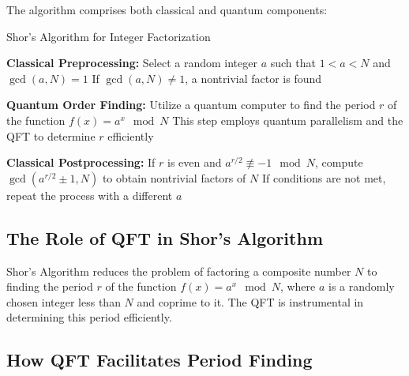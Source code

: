 \documentclass{article}
\begin{document}
The algorithm comprises both classical and quantum components:

\begin{algorithm}[H]
    \caption{Shor's Algorithm for Integer Factorization}
    \begin{algorithmic}[1]
        \State \textbf{Classical Preprocessing:}
        \State \hspace{0.5cm} Select a random integer $a$ such that $1 < a < N$ and $\gcd(a, N) = 1$
        \State \hspace{0.5cm} If $\gcd(a, N) \neq 1$, a nontrivial factor is found

        \State \textbf{Quantum Order Finding:}
        \State \hspace{0.5cm} Utilize a quantum computer to find the period $r$ of the function $f(x) = a^x \mod N$
        \State \hspace{0.5cm} This step employs quantum parallelism and the QFT to determine $r$ efficiently

        \State \textbf{Classical Postprocessing:}
        \State \hspace{0.5cm} If $r$ is even and $a^{r/2} \not\equiv -1 \mod N$, compute $\gcd(a^{r/2} \pm 1, N)$ to obtain nontrivial factors of $N$
        \State \hspace{0.5cm} If conditions are not met, repeat the process with a different $a$
    \end{algorithmic}
\end{algorithm}

\subsection{The Role of QFT in Shor's Algorithm}

Shor's Algorithm reduces the problem of factoring a composite number $N$ to finding the period $r$ of the function $f(x) = a^x \mod N$, where $a$ is a randomly chosen integer less than $N$ and coprime to it. The QFT is instrumental in determining this period efficiently.

\subsection{How QFT Facilitates Period Finding}
\end{document}
